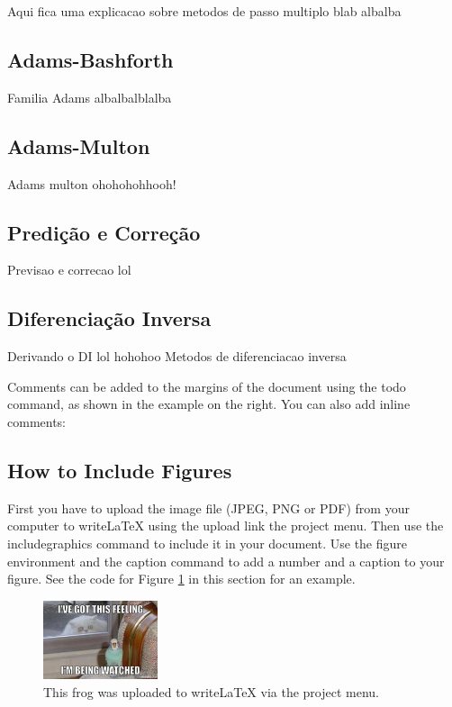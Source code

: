 \documentclass[a4paper]{article}
\begin{document}
Aqui fica uma explicacao sobre metodos de passo multiplo blab albalba

\subsection{Adams-Bashforth}


Familia Adams albalbalblalba


\subsection{Adams-Multon}

Adams multon ohohohohhooh!

\subsection{Predição e Correção}

Previsao e correcao lol

\subsection{Diferenciação Inversa}

Derivando o DI lol hohohoo Metodos de diferenciacao inversa


Comments can be added to the margins of the document using the  todo command, as shown in the example on the right. You can also add inline comments:


\subsection{How to Include Figures}

First you have to upload the image file (JPEG, PNG or PDF) from your computer to writeLaTeX using the upload link the project menu. Then use the includegraphics command to include it in your document. Use the figure environment and the caption command to add a number and a caption to your figure. See the code for Figure \ref{fig:frog} in this section for an example.

\begin{figure}
\centering
\includegraphics[width=0.3\textwidth]{watched.jpg}
\caption{\label{fig:frog}This frog was uploaded to writeLaTeX via the project menu.}
\end{figure}
\end{document}
